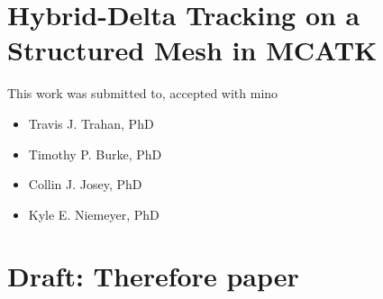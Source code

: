 



\section{Hybrid-Delta Tracking on a Structured Mesh in MCATK}

This work was submitted to, accepted with mino

\begin{itemize}
    \item Travis J. Trahan, PhD
    \item Timothy P. Burke, PhD
    \item Collin J. Josey, PhD
    \item Kyle E. Niemeyer, PhD
\end{itemize}

\label{app:hybridmcatk}


\section{Draft: Therefore paper}
\label{app:therefore}
%
%
%


